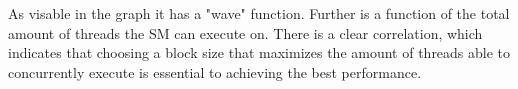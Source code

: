 
As visable in the graph it has a "wave" function.
Further is a function of the total amount of threads the SM can execute on.
There is a clear correlation, which indicates that choosing a block size that maximizes the amount of threads able to concurrently execute is essential to achieving the best performance.
